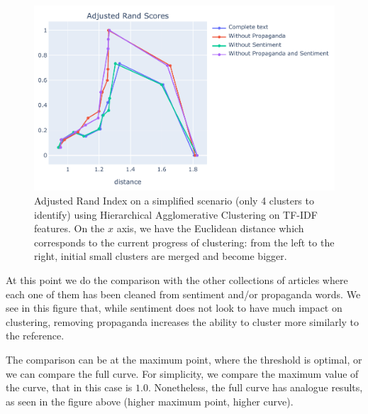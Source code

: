 \begin{figure}[!htbp]
    \centering
    \includegraphics[width=\linewidth]{figures/sentpropnoise_4_en_tfidf_fitness_topic-cropped.pdf}
    \caption{Adjusted Rand Index on a simplified scenario (only 4 clusters to identify) using Hierarchical Agglomerative Clustering on TF-IDF features. On the $x$ axis, we have the Euclidean distance which corresponds to the current progress of clustering: from the left to the right, initial small clusters are merged and become bigger.}
    \label{fig:hierarchical_sentpropnoise_evolution}
\end{figure}

At this point we do the comparison with the other collections of articles where each one of them has been cleaned from sentiment and/or propaganda words. We see in this figure that, while sentiment does not look to have much impact on clustering, removing propaganda increases the ability to cluster more similarly to the reference. 

The comparison can be at the maximum point, where the threshold is optimal, %
or we can compare the full curve. For simplicity, we compare the maximum value of the curve, that in this case is $1.0$.
Nonetheless, the full curve has analogue results, as seen in the figure above (higher maximum point, higher curve).

